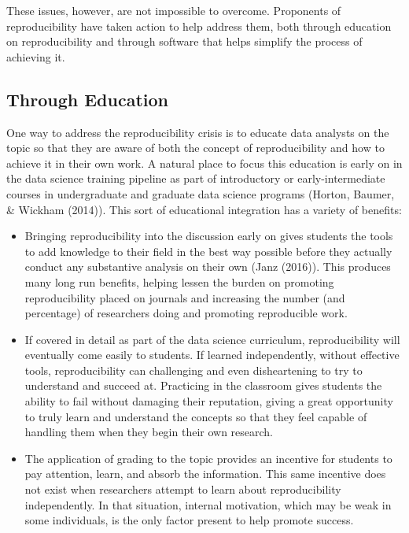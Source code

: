 \documentclass[12pt,twoside]{reedthesis}
\begin{document}
These issues, however, are not impossible to overcome. Proponents of reproducibility have taken action to help address them, both through education on reproducibility and through software that helps simplify the process of achieving it.

\hypertarget{through-education}{%
\subsection{Through Education}\label{through-education}}

One way to address the reproducibility crisis is to educate data analysts on the topic so that they are aware of both the concept of reproducibility and how to achieve it in their own work. A natural place to focus this education is early on in the data science training pipeline as part of introductory or early-intermediate courses in undergraduate and graduate data science programs (Horton, Baumer, \& Wickham (2014)). This sort of educational integration has a variety of benefits:
\begin{itemize}
\item
  Bringing reproducibility into the discussion early on gives students the tools to add knowledge to their field in the best way possible before they actually conduct any substantive analysis on their own (Janz (2016)). This produces many long run benefits, helping lessen the burden on promoting reproducibility placed on journals and increasing the number (and percentage) of researchers doing and promoting reproducible work.
\item
  If covered in detail as part of the data science curriculum, reproducibility will eventually come easily to students. If learned independently, without effective tools, reproducibility can challenging and even disheartening to try to understand and succeed at. Practicing in the classroom gives students the ability to fail without damaging their reputation, giving a great opportunity to truly learn and understand the concepts so that they feel capable of handling them when they begin their own research.
\item
  The application of grading to the topic provides an incentive for students to pay attention, learn, and absorb the information. This same incentive does not exist when researchers attempt to learn about reproducibility independently. In that situation, internal motivation, which may be weak in some individuals, is the only factor present to help promote success.
\end{itemize}
\end{document}
